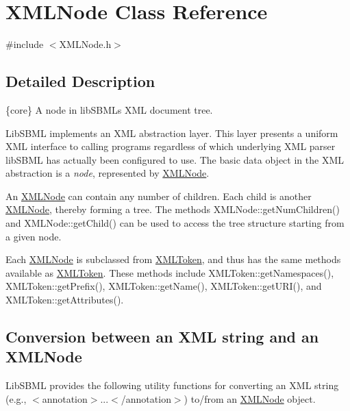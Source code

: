 \hypertarget{class_x_m_l_node}{}\section{X\+M\+L\+Node Class Reference}
\label{class_x_m_l_node}


{\ttfamily \#include $<$X\+M\+L\+Node.\+h$>$}



\subsection{Detailed Description}
\{core\} A node in lib\+S\+B\+ML\textquotesingle{}s X\+ML document tree.

Lib\+S\+B\+ML implements an X\+ML abstraction layer. This layer presents a uniform X\+ML interface to calling programs regardless of which underlying X\+ML parser lib\+S\+B\+ML has actually been configured to use. The basic data object in the X\+ML abstraction is a {\itshape node}, represented by \hyperlink{class_x_m_l_node}{X\+M\+L\+Node}.

An \hyperlink{class_x_m_l_node}{X\+M\+L\+Node} can contain any number of children. Each child is another \hyperlink{class_x_m_l_node}{X\+M\+L\+Node}, thereby forming a tree. The methods X\+M\+L\+Node\+::get\+Num\+Children() and X\+M\+L\+Node\+::get\+Child() can be used to access the tree structure starting from a given node.

Each \hyperlink{class_x_m_l_node}{X\+M\+L\+Node} is subclassed from \hyperlink{class_x_m_l_token}{X\+M\+L\+Token}, and thus has the same methods available as \hyperlink{class_x_m_l_token}{X\+M\+L\+Token}. These methods include X\+M\+L\+Token\+::get\+Namespaces(), X\+M\+L\+Token\+::get\+Prefix(), X\+M\+L\+Token\+::get\+Name(), X\+M\+L\+Token\+::get\+U\+R\+I(), and X\+M\+L\+Token\+::get\+Attributes().\hypertarget{class_x_m_l_node_xmlnode-str2xmlnode}{}\subsection{Conversion between an X\+M\+L string and an X\+M\+L\+Node}\label{class_x_m_l_node_xmlnode-str2xmlnode}
Lib\+S\+B\+ML provides the following utility functions for converting an X\+ML string (e.\+g., {\ttfamily $<$annotation$>$...$<$/annotation$>$}) to/from an \hyperlink{class_x_m_l_node}{X\+M\+L\+Node} object.


